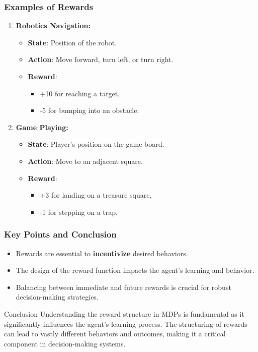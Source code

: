 \documentclass{beamer}
\begin{document}
\begin{frame}[fragile]
    \frametitle{Examples of Rewards}
    
    \begin{enumerate}
        \item \textbf{Robotics Navigation:}
        \begin{itemize}
            \item \textbf{State}: Position of the robot.
            \item \textbf{Action}: Move forward, turn left, or turn right.
            \item \textbf{Reward}: 
            \begin{itemize}
                \item +10 for reaching a target,
                \item -5 for bumping into an obstacle.
            \end{itemize}
        \end{itemize}
        
        \item \textbf{Game Playing:}
        \begin{itemize}
            \item \textbf{State}: Player's position on the game board.
            \item \textbf{Action}: Move to an adjacent square.
            \item \textbf{Reward}: 
            \begin{itemize}
                \item +3 for landing on a treasure square,
                \item -1 for stepping on a trap.
            \end{itemize}
        \end{itemize}
    \end{enumerate}
\end{frame}

\begin{frame}[fragile]
    \frametitle{Key Points and Conclusion}
    
    \begin{itemize}
        \item Rewards are essential to \textbf{incentivize} desired behaviors.
        \item The design of the reward function impacts the agent's learning and behavior.
        \item Balancing between immediate and future rewards is crucial for robust decision-making strategies.
    \end{itemize}

    \begin{block}{Conclusion}
        Understanding the reward structure in MDPs is fundamental as it significantly influences the agent's learning process.
        The structuring of rewards can lead to vastly different behaviors and outcomes, making it a critical component in decision-making systems.
    \end{block}
\end{frame}
\end{document}
